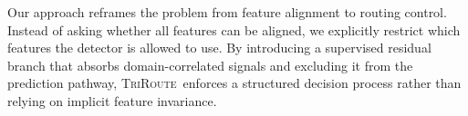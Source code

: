 \documentclass{article}
\newcommand{\method}{\textsc{TriRoute}}
\begin{document}
Our approach reframes the problem from feature alignment to routing control. Instead of asking whether all features can be aligned, we explicitly restrict which features the detector is allowed to use. By introducing a supervised residual branch that absorbs domain-correlated signals and excluding it from the prediction pathway, \method\ enforces a structured decision process rather than relying on implicit feature invariance.



\end{document}
